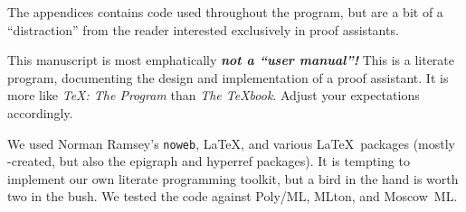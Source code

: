 \begin{node}
The appendices contains code used throughout the program, but are a
bit of a ``distraction'' from the reader interested exclusively in
proof assistants.
\end{node}

\begin{node}[Caution]
This manuscript is most emphatically \textbf{\emph{not a ``user manual''!}}
This is a literate program, documenting the design and implementation
of a proof assistant. It is more like \textit{\TeX: The Program} than
\textit{The \TeX{}book}. Adjust your expectations accordingly.

We used Norman Ramsey's \texttt{noweb}, \LaTeX, and various
\LaTeX\ packages (mostly \AmS-created, but also the epigraph and
hyperref packages). It is tempting to implement our own literate
programming toolkit, but a bird in the hand is worth two in the bush.
We tested the code against Poly/ML, MLton, and Moscow~ML. 
\end{node}